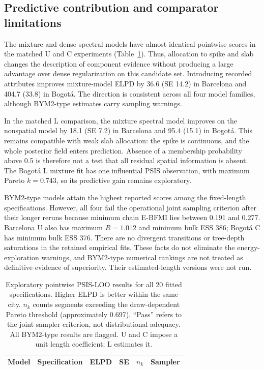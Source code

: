 \documentclass[11pt]{article}
\begin{document}
\FloatBarrier
\subsection{Predictive contribution and comparator limitations}
The mixture and dense spectral models have almost identical pointwise scores in the matched U and C experiments (Table~\ref{tab:prediction}). Thus, allocation to spike and slab changes the description of component evidence without producing a large advantage over dense regularization on this candidate set. Introducing recorded attributes improves mixture-model ELPD by 36.6 (SE 14.2) in Barcelona and 404.7 (33.8) in Bogot\'a. The direction is consistent across all four model families, although BYM2-type estimates carry sampling warnings.

In the matched L comparison, the mixture spectral model improves on the nonspatial model by 18.1 (SE 7.2) in Barcelona and 95.4 (15.1) in Bogot\'a. This remains compatible with weak slab allocation: the spike is continuous, and the whole posterior field enters prediction. Absence of a membership probability above 0.5 is therefore not a test that all residual spatial information is absent. The Bogot\'a L mixture fit has one influential PSIS observation, with maximum Pareto $k=0.743$, so its predictive gain remains exploratory.

BYM2-type models attain the highest reported scores among the fixed-length specifications. However, all four fail the operational joint sampling criterion after their longer reruns because minimum chain E-BFMI lies between 0.191 and 0.277. Barcelona U also has maximum $\widehat R=1.012$ and minimum bulk ESS 386; Bogot\'a C has minimum bulk ESS 376. There are no divergent transitions or tree-depth saturations in the retained empirical fits. These facts do not eliminate the energy-exploration warnings, and BYM2-type numerical rankings are not treated as definitive evidence of superiority. Their estimated-length versions were not run.

\begin{table}[p]\centering\small
\caption{Exploratory pointwise PSIS-LOO results for all 20 fitted specifications. Higher ELPD is better within the same city. $n_k$ counts segments exceeding the draw-dependent Pareto threshold (approximately 0.697). ``Pass'' refers to the joint sampler criterion, not distributional adequacy. All BYM2-type results are flagged. U and C impose a unit length coefficient; L estimates it.}
\label{tab:prediction}
\begin{tabular}{llrrrl}\toprule
Model & Specification & ELPD & SE & $n_k$ & Sampler\\\midrule
\end{tabular}\end{table}
\end{document}
